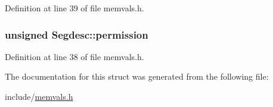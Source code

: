 \-Definition at line 39 of file memvals.\-h.

\hypertarget{structSegdesc_a2ab463dbb1b304bf3ab79ba0abaf4eaa}{
\subsubsection[{permission}]{\setlength{\rightskip}{0pt plus 5cm}unsigned {\bf \-Segdesc\-::permission}}}\label{structSegdesc_a2ab463dbb1b304bf3ab79ba0abaf4eaa}


\-Definition at line 38 of file memvals.\-h.



\-The documentation for this struct was generated from the following file\-:\begin{DoxyCompactItemize}
\item 
include/\hyperlink{memvals_8h}{memvals.\-h}\end{DoxyCompactItemize}
